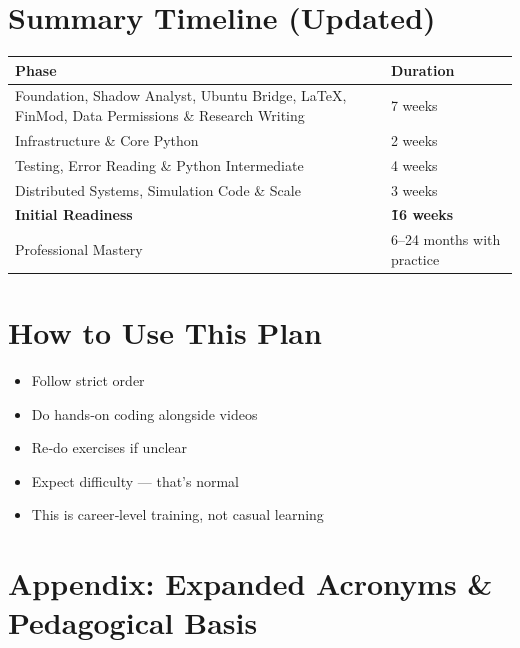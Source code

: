 \documentclass[12pt]{article}
\begin{document}
	\newpage
	
	\section*{Summary Timeline (Updated)}
	
	\begin{tabularx}{\textwidth}{|l|X|}
		\hline
		\textbf{Phase} & \textbf{Duration} \\
		\hline
		Foundation, Shadow Analyst, Ubuntu Bridge, LaTeX, FinMod, Data Permissions \& Research Writing & 7 weeks \\
		\hline
		Infrastructure \& Core Python & 2 weeks \\
		\hline
		Testing, Error Reading \& Python Intermediate & 4 weeks \\
		\hline
		Distributed Systems, Simulation Code \& Scale & 3 weeks \\
		\hline
		\textbf{Initial Readiness} & \textbf{\~16 weeks} \\
		\hline
		Professional Mastery & 6–24 months with practice \\
		\hline
	\end{tabularx}
	
	\vspace{0.5cm}
	
	\section*{How to Use This Plan}
	\begin{itemize}
		\item Follow strict order
		\item Do hands‑on coding alongside videos
		\item Re‑do exercises if unclear
		\item Expect difficulty — that’s normal
		\item This is career‑level training, not casual learning
	\end{itemize}
	
	\newpage
	
	\section*{Appendix: Expanded Acronyms \& Pedagogical Basis}
	
\end{document}
